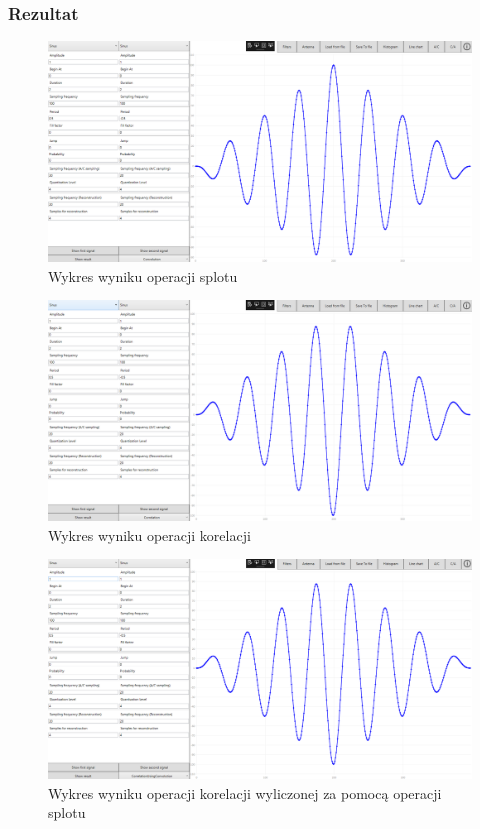 \documentclass[12pt]{article}
\begin{document}
\subsubsection{Rezultat}

\begin{figure}[H]
 \centering
 \includegraphics[width=14cm]{images/conv.PNG}
 \vspace{-0.3cm}
 \caption{Wykres wyniku operacji splotu}
 \label{gui}
\end{figure}
\begin{figure}[H]
 \centering
 \includegraphics[width=14cm]{images/corel.PNG}
 \vspace{-0.3cm}
 \caption{Wykres wyniku operacji korelacji}
 \label{gui}
\end{figure}
\begin{figure}[H]
 \centering
 \includegraphics[width=14cm]{images/corelconv.PNG}
 \vspace{-0.3cm}
 \caption{Wykres wyniku operacji korelacji wyliczonej za pomocą operacji splotu}
 \label{gui}
\end{figure}
\end{document}
